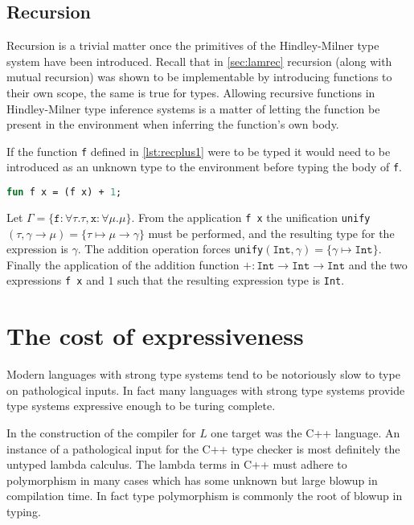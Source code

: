 \documentclass[11pt,oneside,a4paper]{report}
\begin{document}
\subsection{Recursion}
Recursion is a trivial matter once the primitives of the Hindley-Milner type system have been introduced.
Recall that in \autoref{sec:lamrec} recursion (along with mutual recursion) was shown to be implementable by introducing functions to their own scope, the same is true for types.
Allowing recursive functions in Hindley-Milner type inference systems is a matter of letting the function be present in the environment when inferring the function's own body.
\begin{exmp}
If the function \texttt{f} defined in \autoref{lst:recplus1} were to be typed it would need to be introduced as an unknown type to the environment before typing the body of \texttt{f}.
\begin{lstlisting}[language=ML,caption={Recursive function},label={lst:recplus1},mathescape=true]
fun f x = (f x) + 1;
\end{lstlisting}
Let $\Gamma = \{ \texttt{f} : \forall \tau . \tau, \texttt{x} : \forall \mu . \mu \}$.
From the application \texttt{f x} the unification \texttt{unify}$(\tau, \gamma \rightarrow \mu) = \{ \tau \mapsto \mu \rightarrow \gamma \}$ must be performed, and the resulting type for the expression is $\gamma$.
The addition operation forces \texttt{unify}$(\texttt{Int}, \gamma) = \{ \gamma \mapsto \texttt{Int} \}$.
Finally the application of the addition function $+: \texttt{Int} \rightarrow \texttt{Int} \rightarrow \texttt{Int}$ and the two expressions \texttt{f x} and $1$ such that the resulting expression type is \texttt{Int}.

\end{exmp}

\section{The cost of expressiveness}
Modern languages with strong type systems tend to be notoriously slow to type on pathological inputs.
In fact many languages with strong type systems provide type systems expressive enough to be turing complete.

In the construction of the compiler for $L$ one target was the C++ language.
An instance of a pathological input for the C++ type checker is most definitely the untyped lambda calculus.
The lambda terms in C++ must adhere to polymorphism in many cases which has some unknown but large blowup in compilation time.
In fact type polymorphism is commonly the root of blowup in typing.
\end{document}

